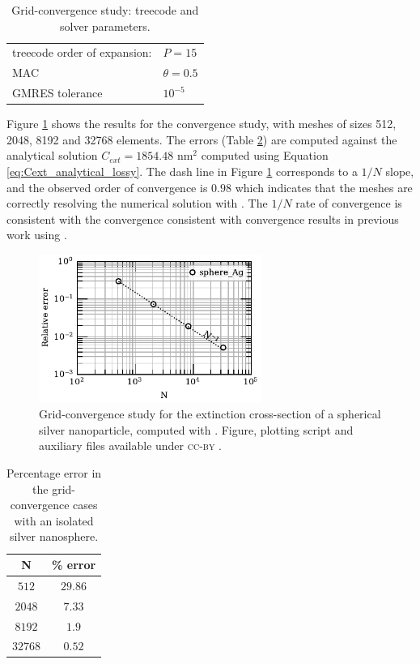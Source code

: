 \begin{table}%
    \centering
    \caption{\label{table:treeparams1} Grid-convergence study: treecode and solver parameters.} 
    \begin{tabular}{l l}
    \hline%
    treecode order of expansion: & $P=15$\\
    MAC                          & $\theta=0.5$\\
    GMRES tolerance                    & $10^{-5}$\\
    \hline%
    \end{tabular}
\end{table}

Figure \ref{fig:conv_iso_sph} shows the results for the convergence study, with meshes of sizes 512, 2048, 
8192 and 32768 elements. The errors (Table \ref{table:err_iso_sph}) are computed against 
the analytical solution $C_{ext} = 1854.48$ nm$^2$ computed using Equation \eqref{eq:Cext_analytical_lossy}.
The dash line in Figure \ref{fig:conv_iso_sph} corresponds to a $1/N$ slope, and the observed order of 
convergence is $0.98$ which indicates that the meshes are correctly resolving the numerical solution with \pygbe.
The $1/N$ rate of convergence is consistent with the convergence consistent with convergence results in
previous work using \pygbe \cite{CooperBardhanBarba2013}. 

\begin{figure}[h] %
    \centering
    \includegraphics[width=0.65\textwidth]{convergence_sph_Ag_R8_w380.pdf} 
    \caption{Grid-convergence study for the extinction cross-section of a spherical silver
             nanoparticle, computed with \pygbe. Figure, plotting script and auxiliary files 
             available under \textsc{cc-by} \cite{ClementiETal2018c}.}
    \label{fig:conv_iso_sph}
 \end{figure}
 
 
 \begin{table}[h]
     \centering
     \caption{\label{table:err_iso_sph} Percentage error in the grid-convergence cases with an 
     isolated silver nanosphere.} 
     \begin{tabular}{c c}
     \hline%
     N & \% error \\
     \hline%
      $512$ & $29.86$ \\
      $2048$ & $7.33$ \\
      $8192$ & $1.9$ \\
      $32768$ & $0.52$ \\
     \hline%
     \end{tabular}
 \end{table}


